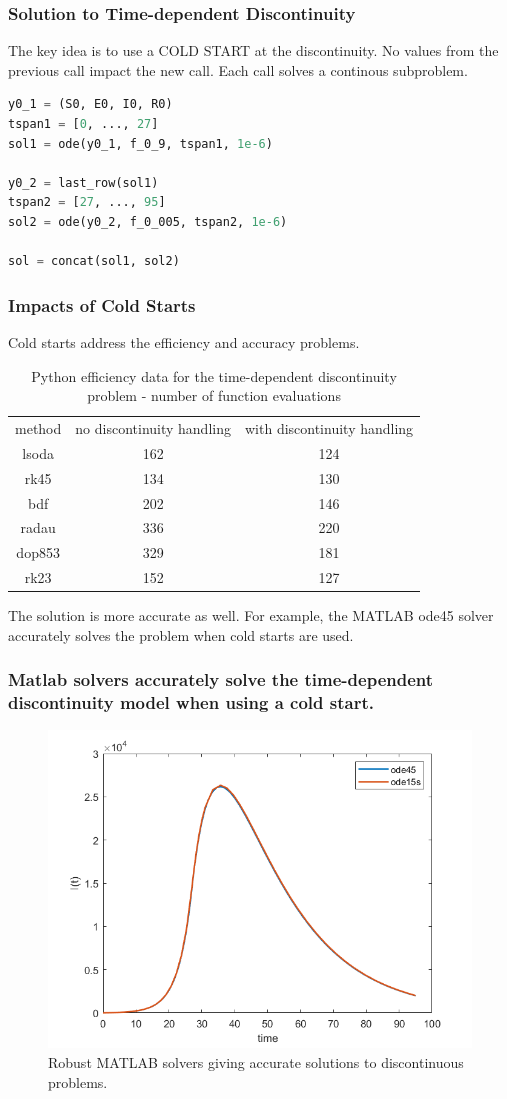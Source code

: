 \documentclass{beamer}
\begin{document}
\begin{frame}[fragile]
\frametitle{Solution to Time-dependent Discontinuity}
The key idea is to use a COLD START at the discontinuity. No values from the previous call impact the new call. Each call solves a continous subproblem.
\begin{lstlisting}[language=Python]
y0_1 = (S0, E0, I0, R0)
tspan1 = [0, ..., 27]
sol1 = ode(y0_1, f_0_9, tspan1, 1e-6)

y0_2 = last_row(sol1)
tspan2 = [27, ..., 95]
sol2 = ode(y0_2, f_0_005, tspan2, 1e-6)

sol = concat(sol1, sol2)
\end{lstlisting}
\end{frame}

\begin{frame}
\frametitle{Impacts of Cold Starts}
Cold starts address the efficiency and accuracy problems.
\begin{table}[H]
\caption {Python efficiency data for the time-dependent discontinuity problem - number of function evaluations} 
\label{tab:time_discontinuity_Py} 
\begin{center}
\begin{tabular}{ c c c }
method & no discontinuity handling & with discontinuity handling \\ 
lsoda & 162 & 124 \\
rk45 & 134 & 130 \\
bdf & 202 & 146 \\
radau & 336 & 220 \\
dop853 & 329 & 181 \\
rk23 & 152 & 127 \\
\end{tabular}
\end{center}
\end{table}
The solution is more accurate as well. For example, the MATLAB ode45 solver accurately solves the problem when cold starts are used.
\end{frame}

\begin{frame}
\frametitle{Matlab solvers accurately solve the time-dependent discontinuity model when using a cold start.}
\begin{figure}[H]
\centering
\includegraphics[width=0.7\linewidth]{./figures/solve_time_discontinuity_matlab}
\caption{Robust MATLAB solvers giving accurate solutions to discontinuous problems.}
\label{fig:solve_time_discontinuity_matlab}
\end{figure}
\end{frame}
\end{document}
